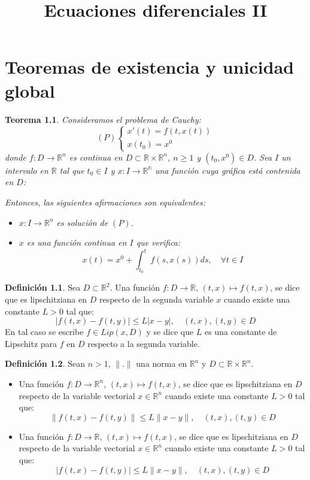 \documentclass{report}
\title{Ecuaciones diferenciales II}
\author{}
\newtheorem{theorem}{Teorema}[chapter]
\theoremstyle{remark}
\theoremstyle{remark}
\theoremstyle{remark}
\theoremstyle{definition}
\newtheorem{definition}{Definición}[chapter]
\theoremstyle{definition}
\theoremstyle{definition}
\begin{document}
\maketitle
\tableofcontents

\chapter{Teoremas de existencia y unicidad global}
\begin{theorem}
    Consideramos el problema de Cauchy:
    $$(P) \begin{cases}
            x'(t) = f(t, x(t)) \\
            x(t_0) = x^0
        \end{cases}$$
    donde $f: D \to \mathbb{R}^n$ es continua en $D \subset \mathbb{R} \times \mathbb{R}^n$, $n \geq 1$ y $(t_0, x^0) \in D$.
    Sea $I$ un intervalo en $\mathbb{R}$ tal que $t_0 \in I$ y $x: I \to \mathbb{R^n}$ una función cuya gráfica está contenida en $D$:

    Entonces, las siguientes afirmaciones son equivalentes:
    \begin{itemize}
        \item $x: I \to \mathbb{R}^n$ es solución de $(P)$.
        \item $x$ es una función continua en $I$ que verifica:
              $$x(t) = x^0 + \int_{t_0}^t f(s, x(s))ds, \quad \forall t \in I$$
    \end{itemize}
\end{theorem}

\begin{definition}
    Sea $D \subset \mathbb{R}^2$.
    Una función $f: D \to \mathbb{R}$, $(t, x) \mapsto f(t, x)$, se dice que es lipschitziana en $D$ respecto de la segunda variable $x$ cuando existe una constante $L > 0$ tal que:
    $$|f(t, x) - f(t, y)| \leq L|x-y|, \quad (t, x), (t, y) \in D$$
    En tal caso se escribe $f \in Lip(x, D)$ y se dice que $L$ es una constante de Lipschitz para $f$ en $D$ respecto a la segunda variable.
\end{definition}

\begin{definition}
    Sean $n > 1$, $\|.\|$ una norma en $\mathbb{R}^n$ y $D \subset \mathbb{R} \times \mathbb{R}^n$.
    \begin{itemize}
        \item Una función $f: D \to \mathbb{R}^n$, $(t, x) \mapsto f(t, x)$, se dice que es lipschitziana en $D$ respecto de la variable vectorial $x \in \mathbb{R}^n$ cuando existe una constante $L > 0$ tal que:
              $$\|f(t, x) - f(t, y)\| \leq L\|x-y\|, \quad (t, x), (t, y) \in D$$
        \item Una función $f: D \to \mathbb{R}$, $(t, x) \mapsto f(t, x)$, se dice que es lipschitziana en $D$ respecto de la variable vectorial $x \in \mathbb{R}^n$ cuando existe una constante $L > 0$ tal que:
              $$|f(t, x) - f(t, y)| \leq L\|x-y\|, \quad (t, x), (t, y) \in D$$
    \end{itemize}
\end{definition}
\end{document}
